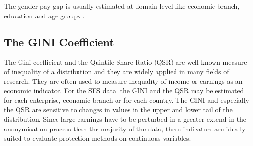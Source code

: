 \documentclass[12pt]{article}
\begin{document}
%
%
%
%




The gender pay gap is usually estimated at domain level like economic branch,
education and age groups \citep{geissberger09}.


\subsection{The GINI Coefficient}

The Gini coefficient \citep{gini12} and the Quintile Share Ratio (QSR) are well
known measure of inequality of a distribution and they are widely applied in
many fields of research. They are often used to measure inequality of income or
earnings as an economic indicator. For the SES data, the GINI and the QSR may be
estimated for each enterprise, economic branch or for each country.
The GINI and especially the QSR are sensitive to changes in values 
in the upper and lower tail of the distribution. Since large earnings
have to be perturbed in a greater extend in the anonymisation process 
than the majority of the
data, these indicators are ideally suited to evaluate protection 
methods on continuous variables.
\end{document}
